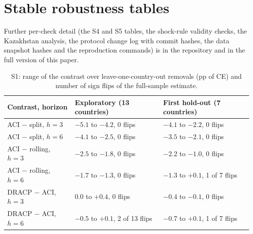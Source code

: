 \section{Stable robustness tables}\label{app:extra}

Further per-check detail (the S4 and S5 tables, the shock-rule validity checks, the Kazakhstan analysis, the protocol change log with commit hashes, the data snapshot hashes and the reproduction commands) is in the repository and in the full version of this paper.

\begin{table}[H]
\centering
\caption{S1: range of the contrast over leave-one-country-out removals (pp of CE) and number of sign flips of the full-sample estimate.}
\label{tab:loo}
\small
\begin{tabular}{@{}lll@{}}
\toprule
Contrast, horizon & Exploratory (13 countries) & First hold-out (7 countries) \\
\midrule
ACI $-$ split, $h=3$ & $-5.1$ to $-4.2$, 0 flips & $-4.1$ to $-2.2$, 0 flips \\
ACI $-$ split, $h=6$ & $-4.1$ to $-2.5$, 0 flips & $-3.5$ to $-2.1$, 0 flips \\
ACI $-$ rolling, $h=3$ & $-2.5$ to $-1.8$, 0 flips & $-2.2$ to $-1.0$, 0 flips \\
ACI $-$ rolling, $h=6$ & $-1.7$ to $-1.3$, 0 flips & $-1.3$ to $+0.1$, 1 of 7 flips \\
DRACP $-$ ACI, $h=3$ & $0.0$ to $+0.4$, 0 flips & $-0.4$ to $-0.1$, 0 flips \\
DRACP $-$ ACI, $h=6$ & $-0.5$ to $+0.1$, 2 of 13 flips & $-0.7$ to $+0.1$, 1 of 7 flips \\
\bottomrule
\end{tabular}
\end{table}

